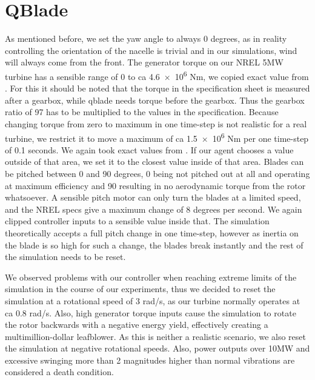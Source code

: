 \documentclass[hyperref,final,beleg]{cgvpub}
\begin{document}
\section{QBlade}

\label{sec:alg_QBlade}

As mentioned before, we set the yaw angle to always 0 degrees, as in reality controlling the orientation of the nacelle is trivial and in our simulations, wind will always come from the front. The generator torque on our NREL 5MW turbine has a sensible range of \num{0} to ca \num{4.6e6} Nm, we copied exact value from \cite[Table 7-2]{jonkmanDefinition5MWReference2009}. For this it should be noted that the torque in the specification sheet is measured after a gearbox, while qblade needs torque before the gearbox. Thus the gearbox ratio of 97 has to be multiplied to the values in the specification.
Because changing torque from zero to maximum in one time-step is not realistic for a real turbine, we restrict it to move a maximum of ca \num{1.5e6} Nm per one time-step of 0.1 seconds. We again took exact values from \cite[Table 7-2]{jonkmanDefinition5MWReference2009}. If our agent chooses a value outside of that area, we set it to the closest value inside of that area.
Blades can be pitched between 0 and 90 degrees, 0 being not pitched out at all and operating at maximum efficiency and 90 resulting in no aerodynamic torque from the rotor whatsoever. A sensible pitch motor can only turn the blades at a limited speed, and the NREL specs give a maximum change of 8 degrees per second. We again clipped controller inputs to a sensible value inside that. The simulation theoretically accepts a full pitch change in one time-step, however as inertia on the blade is so high for such a change, the blades break instantly and the rest of the simulation needs to be reset.

We observed problems with our controller when reaching extreme limits of the simulation in the course of our experiments, thus we decided to reset the simulation at a rotational speed of 3 rad/s, as our turbine normally operates at ca 0.8 rad/s. Also, high generator torque inputs cause the simulation to rotate the rotor backwards with a negative energy yield, effectively creating a multimillion-dollar leafblower. As this is neither a realistic scenario, we also reset the simulation at negative rotational speeds. Also, power outputs over 10MW and excessive swinging more than 2 magnitudes higher than normal vibrations are considered a death condition.
\end{document}
